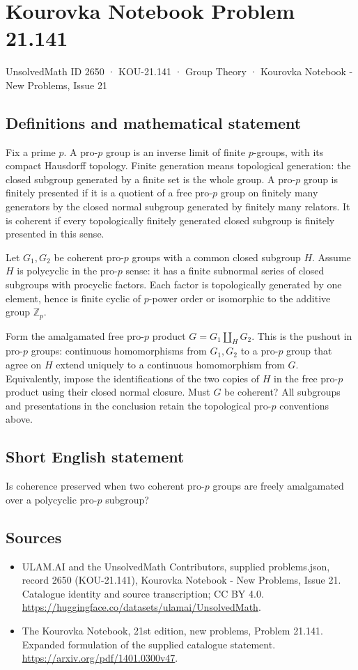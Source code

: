 \documentclass[11pt,a4paper]{article}
\begin{document}
\section*{Kourovka Notebook Problem 21.141}\label{2650}
{\small UnsolvedMath ID 2650 · KOU-21.141 · Group Theory · Kourovka Notebook - New Problems, Issue 21}
\subsection{Definitions and mathematical statement}
Fix a prime $p$. A pro-$p$ group is an inverse limit of finite $p$-groups,
with its compact Hausdorff topology. Finite generation means topological
generation: the closed subgroup generated by a finite set is the whole group.
A pro-$p$ group is finitely presented if it is a quotient of a free pro-$p$
group on finitely many generators by the closed normal subgroup generated by
finitely many relators. It is coherent if every topologically finitely generated
closed subgroup is finitely presented in this sense.

Let $G_1,G_2$ be coherent pro-$p$ groups with a common closed subgroup $H$.
Assume $H$ is polycyclic in the pro-$p$ sense: it has a finite subnormal series
of closed subgroups with procyclic factors. Each factor is topologically
generated by one element, hence is finite cyclic of $p$-power order or
isomorphic to the additive group $\mathbb Z_p$.

Form the amalgamated free pro-$p$ product $G=G_1\amalg_H G_2$. This is the
pushout in pro-$p$ groups: continuous homomorphisms from $G_1,G_2$ to a
pro-$p$ group that agree on $H$ extend uniquely to a continuous homomorphism
from $G$. Equivalently, impose the identifications of the two copies of $H$
in the free pro-$p$ product using their closed normal closure.
Must $G$ be coherent? All subgroups and presentations in the conclusion
retain the topological pro-$p$ conventions above.
\subsection{Short English statement}
Is coherence preserved when two coherent pro-$p$ groups are freely amalgamated over a polycyclic pro-$p$ subgroup?
\subsection{Sources}
\begin{itemize}
\item[S1] ULAM.AI and the UnsolvedMath Contributors, supplied problems.json, record 2650 (KOU-21.141), Kourovka Notebook - New Problems, Issue 21. Catalogue identity and source transcription; CC BY 4.0.
\url{https://huggingface.co/datasets/ulamai/UnsolvedMath}.
\item[S2] The Kourovka Notebook, 21st edition, new problems, Problem 21.141. Expanded formulation of the supplied catalogue statement.
\url{https://arxiv.org/pdf/1401.0300v47}.
\end{itemize}
\end{document}
